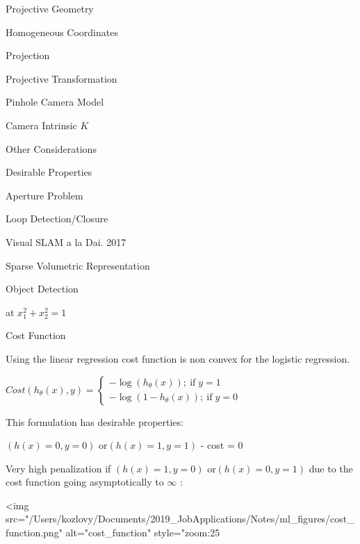 \begin{section}
\begin{subsubsection}
\begin{subsubsection}
\begin{subsubsection}
\begin{section}{Projective Geometry}
\begin{subsection}{Homogeneous Coordinates}
\begin{subsubsection}
{\begin{subsubsection}{Projection}
\begin{subsubsection}{Projective Transformation}
\begin{subsection}
\begin{subsubsection}
\begin{subsubsection}
\begin{subsubsection}
{\begin{subsubsection}
\begin{subsection}
\begin{subsection} {Pinhole Camera Model}
\begin{subsection} {Camera Intrinsic $K$}
\begin{subsection}
\begin{subsection}
\begin{subsubsection}{Other Considerations}
{\begin{subsection}
\begin{subsubsection}{Desirable Properties}
\begin{section}
\begin{subsection}
\begin{subsection}
\begin{subsection}
\begin{section}
\begin{subsection}
\begin{subsubsection}
\begin{subsubsection}
\begin{subsection}
\begin{section}
\begin{subsection}
\begin{subsubsection}{Aperture Problem}
\begin{subsubsection}
{\begin{section}
\begin{subsubsection}
\begin{subsubsection}
\begin{subsubsection}
\begin{subsection}
\begin{subsection}
\begin{subsection}
\begin{subsection}
\begin{subsection}
\begin{subsection}
\begin{subsection}
\begin{subsubsection}
{\begin{subsubsection}
{\begin{subsubsection}
\begin{section}
\begin{section}
\begin{section}
\begin{subsubsection}
\begin{subsubsection}{Loop Detection/Closure}
\begin{subsubsection}{Visual SLAM a la Dai. 2017}
\begin{subsubsection}{Sparse Volumetric Representation}
\begin{subsection}
\begin{section}{Object Detection}
\begin{subsubsection}
{\begin{subsection}
\begin{subsection}
\begin{section}
\begin{section}
\begin{subsection}
\begin{subsubsection}
\begin{subsubsection}
\begin{subsection}
\begin{subsection}
\begin{subsubsection}
\begin{subsubsection}
\begin{subsubsection}
{\begin{subsection}
\begin{subsection}
\begin{subsection}
\begin{subsection}
\begin{section}
\begin{subsection}
\begin{subsubsection}
\begin{subsubsection}
\begin{subsubsection}
\begin{subsubsection}
at $x_1^2 + x_2^2 = 1$

\begin{subsubsection} Cost Function

Using the linear regression cost function is non convex for the logistic regression.

$Cost(h_\theta(x),y) = \begin{cases} -\log(h_\theta(x))  ;\ \text{if} \;  y=1 \\ -\log(1-h_\theta(x))   ;\ \text{if} \;  y=0  \end{cases}$

This formulation has desirable properties: 

$(h(x)=0, y = 0)$ or$(h(x) = 1, y = 1)$  - cost = 0

Very high penalization if $(h(x)=1, y = 0)$ or$(h(x) = 0, y = 1)$ due to the cost function going asymptotically to $\infty$ :

<img src="/Users/kozlovy/Documents/2019_JobApplications/Notes/ml_figures/cost_function.png" alt="cost_function" style="zoom:25%

\end{subsubsection}
\end{subsubsection}
\end{subsubsection}
\end{subsubsection}
\end{subsubsection}
\end{subsection}
\end{section}
\end{subsection}
\end{subsection}
\end{subsection}
\end{subsection}}
\end{subsubsection}
\end{subsubsection}
\end{subsubsection}
\end{subsection}
\end{subsection}
\end{subsubsection}
\end{subsubsection}
\end{subsection}
\end{section}
\end{section}
\end{subsection}
\end{subsection}}
\end{subsubsection}
\end{section}
\end{subsection}
\end{subsubsection}
\end{subsubsection}
\end{subsubsection}
\end{subsubsection}
\end{section}
\end{section}
\end{section}
\end{subsubsection}}
\end{subsubsection}}
\end{subsubsection}
\end{subsection}
\end{subsection}
\end{subsection}
\end{subsection}
\end{subsection}
\end{subsection}
\end{subsection}
\end{subsubsection}
\end{subsubsection}
\end{subsubsection}
\end{section}}
\end{subsubsection}
\end{subsubsection}
\end{subsection}
\end{section}
\end{subsection}
\end{subsubsection}
\end{subsubsection}
\end{subsection}
\end{section}
\end{subsection}
\end{subsection}
\end{subsection}
\end{section}
\end{subsubsection}
\end{subsection}}
\end{subsubsection}
\end{subsection}
\end{subsection}
\end{subsection}
\end{subsection}
\end{subsection}
\end{subsubsection}}
\end{subsubsection}
\end{subsubsection}
\end{subsubsection}
\end{subsection}
\end{subsubsection}
\end{subsubsection}}
\end{subsubsection}
\end{subsection}
\end{section}
\end{subsubsection}
\end{subsubsection}
\end{subsubsection}
\end{section}
